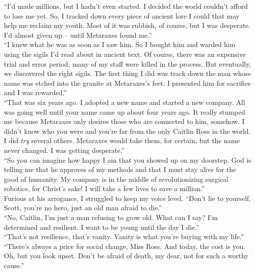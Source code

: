 \documentclass[a5paper]{scrartcl}
\begin{document}
\enquote{I'd made millions, but I hadn't even started. I decided the world couldn't afford to lose me yet. So, I tracked down every piece of ancient lore I could that may help me reclaim my youth. Most of it was rubbish, of course, but I was desperate. I'd almost given up -- until Metaraxes found me.}\\


\enquote{I knew what he was as soon as I saw him. So I bought him and warded him using the sigils I'd read about in ancient text.  Of course, there was an expensive trial and error period; many of my staff were killed in the process. But eventually, we discovered the right sigils. The first thing I did was track down the man whose name was etched into the granite at Metaraxes's feet. I presented him for sacrifice and I was rewarded.}\\


\enquote{That was six years ago. I adopted a new name and started a new company. All was going well until your name came up about four years ago. It really stumped me because Metaraxes only desires those who are connected to him, somehow. I didn't know who you were and you're far from the only Caitlin Ross in the world. I did \textit{try}
 several others. Metaraxes would take them, for certain, but the name never changed. I was getting desperate.}\\


\enquote{So you can imagine how happy I am that you showed up on my doorstep.  God is telling me that he approves of my methods and that I must stay alive for the good of humanity. My company is in the middle of revolutionizing surgical robotics, for Christ's sake! I will take a few lives to save a million.}\\


Furious at his arrogance, I struggled to keep my voice level. \enquote{Don't lie to yourself, Scott, you're no hero, just an old man afraid to die.}\\


\enquote{No, Caitlin, I'm just a man refusing to grow old. What can I say? I'm determined and resilient.  I want to be young until the day I die.}\\


\enquote{That's not resilience, that's vanity. Vanity is what you're buying with my life.} \\


\enquote{There's always a price for social change, Miss Ross. And today, the cost is you. Oh, but you look upset. Don't be afraid of death, my dear, not for such a worthy cause.}\\
\end{document}
